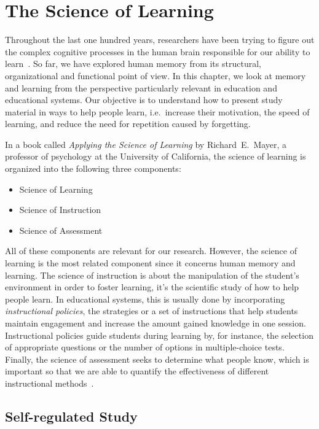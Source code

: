 \section{The Science of Learning}
\label{science-of-learning}

Throughout the last one hundred years, researchers have been trying to figure out the complex cognitive processes in the human brain responsible for our ability to learn~\cite{RichardE.Mayer2010}. So far, we have explored human memory from its structural, organizational and functional point of view. In this chapter, we look at memory and learning from the perspective particularly relevant in education and educational systems. Our objective is to understand how to present study material in ways to help people learn, i.e.~increase their motivation, the speed of learning, and reduce the need for repetition caused by forgetting.

In a book called \textit{Applying the Science of Learning} by Richard~E.~Mayer, a professor of psychology at the University of California, the science of learning is organized into the following three components:

\begin{itemize}
  \item Science of Learning
  \item Science of Instruction
  \item Science of Assessment
\end{itemize}

All of these components are relevant for our research. However, the science of learning is the most related component since it concerns human memory and learning. The science of instruction is about the manipulation of the student's environment in order to foster learning, it's the scientific study of how to help people learn. In educational systems, this is usually done by incorporating \textit{instructional policies}, the strategies or a set of instructions that help students maintain engagement and increase the amount gained knowledge in one session. Instructional policies guide students during learning by, for instance, the selection of appropriate questions or the number of options in multiple-choice tests. Finally, the science of assessment seeks to determine what people know, which is important so that we are able to quantify the effectiveness of different instructional methods~\cite{RichardE.Mayer2010}.

\subsection{Self-regulated Study}
\label{study}

